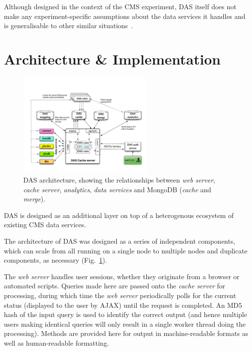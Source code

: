 \documentclass[a4paper]{jpconf}
\begin{document}
Although designed in the context of the CMS experiment, DAS itself does not make any experiment-specific assumptions about the data services it handles and is generalisable to other similar situations~\cite{drsg}.

\section{Architecture \& Implementation}

\begin{figure}
\begin{center}
\includegraphics[width=0.6\textwidth]{DAS_Cache_and_Analytics}
\end{center}
\caption{\label{dasarch}DAS architecture, showing the relationships between \emph{web server}, \emph{cache server}, \emph{analytics}, \emph{data services} and MongoDB (\emph{cache} and \emph{merge}).}
\end{figure}

DAS is designed as an additional layer on top of a heterogenous ecosystem of existing CMS data services.
 
The architecture of DAS was designed as a series of independent components, which can scale from all running on a single node to multiple nodes and duplicate components, as necessary (Fig.~\ref{dasarch}).

The \emph{web server} handles user sessions, whether they originate from a browser or automated scripts. Queries made here are passed onto the \emph{cache server} for processing, during which time the \emph{web server} periodically polls for the current status (displayed to the user by AJAX) until the request is completed. An MD5 hash of the input query is used to identify the correct output (and hence multiple users making identical queries will only result in a single worker thread doing the processing). Methods are provided here for output in machine-readable formats as well as human-readable formatting.
\end{document}
